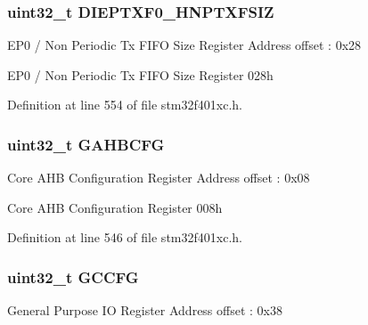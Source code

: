\subsubsection[{\texorpdfstring{D\+I\+E\+P\+T\+X\+F0\+\_\+\+H\+N\+P\+T\+X\+F\+S\+IZ}{DIEPTXF0_HNPTXFSIZ}}]{ uint32\+\_\+t D\+I\+E\+P\+T\+X\+F0\+\_\+\+H\+N\+P\+T\+X\+F\+S\+IZ}\hypertarget{struct_u_s_b___o_t_g___global_type_def_a93412b352267d3faf0bd2dbac590b69e}{}\label{struct_u_s_b___o_t_g___global_type_def_a93412b352267d3faf0bd2dbac590b69e}
E\+P0 / Non Periodic Tx F\+I\+FO Size Register Address offset \+: 0x28

E\+P0 / Non Periodic Tx F\+I\+FO Size Register 028h 

Definition at line 554 of file stm32f401xc.\+h.

\subsubsection[{\texorpdfstring{G\+A\+H\+B\+C\+FG}{GAHBCFG}}]{ uint32\+\_\+t G\+A\+H\+B\+C\+FG}\hypertarget{struct_u_s_b___o_t_g___global_type_def_ac38ac55e4148686564478e95f345b833}{}\label{struct_u_s_b___o_t_g___global_type_def_ac38ac55e4148686564478e95f345b833}
Core A\+HB Configuration Register Address offset \+: 0x08

Core A\+HB Configuration Register 008h 

Definition at line 546 of file stm32f401xc.\+h.

\subsubsection[{\texorpdfstring{G\+C\+C\+FG}{GCCFG}}]{ uint32\+\_\+t G\+C\+C\+FG}\hypertarget{struct_u_s_b___o_t_g___global_type_def_aef85efc005db9a8e37d95644e92e9032}{}\label{struct_u_s_b___o_t_g___global_type_def_aef85efc005db9a8e37d95644e92e9032}
General Purpose IO Register Address offset \+: 0x38

